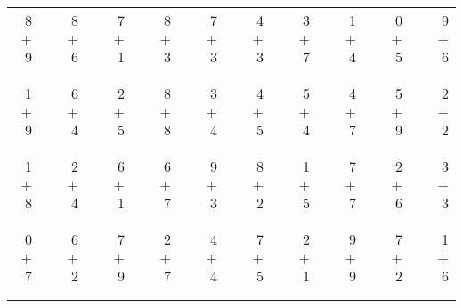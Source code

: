 \documentclass[12pt, letterpaper]{article}
\begin{document}
\begin{tabular}{rrrrrrrrrrrrrrrrrrr}
8 & & 8 & & 7 & & 8 & & 7 & & 4 & & 3 & & 1 & & 0 & & 9\\
$+$ 9 & & $+$ 6 & & $+$ 1 & & $+$ 3 & & $+$ 3 & & $+$ 3 & & $+$ 7 & & $+$ 4 & & $+$ 5 & & $+$ 6\\
\cline{1-1} \cline{3-3} \cline{5-5} \cline{7-7} \cline{9-9} \cline{11-11} \cline{13-13} \cline{15-15} \cline{17-17} \cline{19-19} \\ \\
1 & & 6 & & 2 & & 8 & & 3 & & 4 & & 5 & & 4 & & 5 & & 2\\
$+$ 9 & & $+$ 4 & & $+$ 5 & & $+$ 8 & & $+$ 4 & & $+$ 5 & & $+$ 4 & & $+$ 7 & & $+$ 9 & & $+$ 2\\
\cline{1-1} \cline{3-3} \cline{5-5} \cline{7-7} \cline{9-9} \cline{11-11} \cline{13-13} \cline{15-15} \cline{17-17} \cline{19-19} \\ \\
1 & & 2 & & 6 & & 6 & & 9 & & 8 & & 1 & & 7 & & 2 & & 3\\
$+$ 8 & & $+$ 4 & & $+$ 1 & & $+$ 7 & & $+$ 3 & & $+$ 2 & & $+$ 5 & & $+$ 7 & & $+$ 6 & & $+$ 3\\
\cline{1-1} \cline{3-3} \cline{5-5} \cline{7-7} \cline{9-9} \cline{11-11} \cline{13-13} \cline{15-15} \cline{17-17} \cline{19-19} \\ \\
0 & & 6 & & 7 & & 2 & & 4 & & 7 & & 2 & & 9 & & 7 & & 1\\
$+$ 7 & & $+$ 2 & & $+$ 9 & & $+$ 7 & & $+$ 4 & & $+$ 5 & & $+$ 1 & & $+$ 9 & & $+$ 2 & & $+$ 6\\
\cline{1-1} \cline{3-3} \cline{5-5} \cline{7-7} \cline{9-9} \cline{11-11} \cline{13-13} \cline{15-15} \cline{17-17} \cline{19-19} \\ \\
\end{tabular}
\newpage
\end{document}
